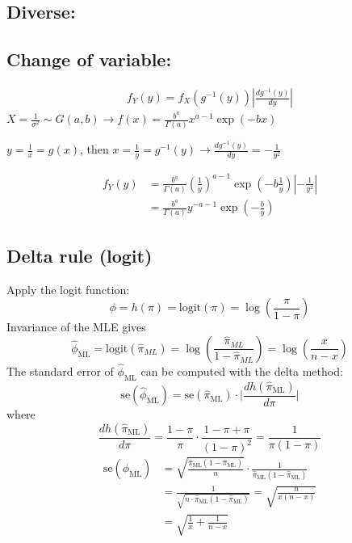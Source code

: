 \documentclass{article}\usepackage[]{graphicx}\usepackage[]{xcolor}
\begin{document}
\begin{multicols*}{2}
\footnotesize

% 
\section{Diverse:}

\subsection{Change of variable:}
\begin{align*}
\boxed{f_Y(y)=f_X(g^{-1}(y))|\frac{dg^{-1}(y)}{dy}|}
\end{align*}
$X=\frac{1}{\sigma^2}\sim G(a,b)\rightarrow f(x)=\frac{b^a}{\Gamma(a)}x^{a-1}\exp(-bx)$

$y=\frac{1}{x}=g(x)$, then $x=\frac{1}{y}=g^{-1}(y)\rightarrow\frac{dg^{-1}(y)}{dy}=-\frac{1}{y^2}$

\begin{align*}
f_Y(y)&=\frac{b^a}{\Gamma(a)}\left(\frac{1}{y}\right)^{a-1}\exp\left(-b\frac{1}{y}\right)|-\frac{1}{y^2}|\\
&=\frac{b^a}{\Gamma(a)}y^{-a-1}\exp\left(-\frac{b}{y}\right)
\end{align*}

\subsection{Delta rule (logit)}

Apply the logit function:
\begin{equation*}
\phi=h(\pi)=\text{logit}(\pi)=\log\left(\frac{\pi}{1-\pi} \right)
\end{equation*}
Invariance of the MLE gives
\begin{equation*}
\hat{\phi}_\text{ML}=\text{logit}(\hat{\pi}_{ML})=\log\left(\frac{\hat{\pi}_{ML}}{1-\hat{\pi}_{ML}} \right)=\log\left(\frac{x}{n-x} \right)
\end{equation*}
The standard error of $\hat{\phi}_\text{ML}$ can be computed with the delta method:
\begin{equation*}
\text{se}(\hat{\phi}_\text{ML})=\text{se}(\hat{\pi}_\text{ML})\cdot \lvert\frac{d h(\hat{\pi}_\text{ML})}{d\pi}\rvert
\end{equation*}
where
\begin{equation*}
\frac{d h(\hat{\pi}_\text{ML})}{d\pi}=\frac{1-\pi}{\pi}\cdot\frac{1-\pi+\pi}{(1-\pi)^2}=\frac{1}{\pi(1-\pi)}
\end{equation*}
\begin{align*}
\text{se}(\hat{\phi}_\text{ML})
&=\sqrt{\frac{\hat{\pi}_\text{ML}(1-\hat{\pi}_\text{ML})}{n}}\cdot\frac{1}{\hat{\pi}_\text{ML}(1-\hat{\pi}_\text{ML})} \\
&=\frac{1}{\sqrt{n\cdot\hat{\pi}_\text{ML}(1-\hat{\pi}_\text{ML})}}=\sqrt{\frac{n}{x(n-x)}} \\
&=\sqrt{\frac{1}{x}+\frac{1}{n-x}}
\end{align*}


\end{multicols*}
\end{document}
